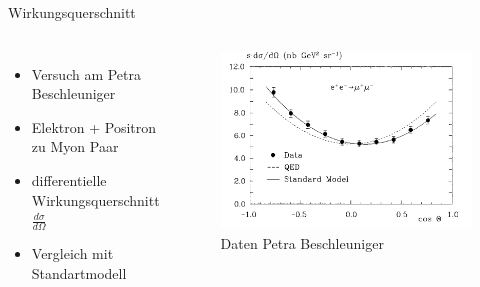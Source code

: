 \documentclass[aspectratio=169,xcolor=dvipsnames]{beamer}
\begin{document}
\begin{frame}{Wirkungsquerschnitt}
    \begin{columns}[c]
        \begin{itemize}
            \item Versuch am Petra Beschleuniger
            \item Elektron + Positron zu Myon Paar
            \item differentielle Wirkungsquerschnitt $\frac{d\sigma}{d\Omega}$
            \item Vergleich mit Standartmodell
        \end{itemize}

        \begin{figure}
            \centering
            \includegraphics[width=1\linewidth]{figures/Petra.png}
            \caption{Daten Petra Beschleuniger}
            \label{fig:Petra}
        \end{figure}
    \end{columns}
\end{frame}
\end{document}
